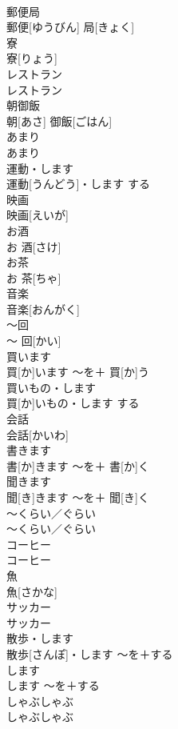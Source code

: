 \documentclass[8pt]{extreport}
\begin{document}
\begin{CJK}{UTF8}{min}
\\	郵便局	
\\	郵便[ゆうびん] 局[きょく]		
\\	寮	
\\	寮[りょう]		
\\	レストラン	
\\	レストラン		
\\	朝御飯	
\\	朝[あさ] 御飯[ごはん]		
\\	あまり	
\\	あまり		
\\	運動・します	
\\	運動[うんどう]・します	する	
\\	映画	
\\	映画[えいが]		
\\	お酒	
\\	お 酒[さけ]		
\\	お茶	
\\	お 茶[ちゃ]		
\\	音楽	
\\	音楽[おんがく]		
\\	〜回	
\\	〜 回[かい]		
\\	買います	
\\	買[か]います	〜を＋ 買[か]う	
\\	買いもの・します	
\\	買[か]いもの・します	する	
\\	会話	
\\	会話[かいわ]		
\\	書きます	
\\	書[か]きます	〜を＋ 書[か]く	
\\	聞きます	
\\	聞[き]きます	〜を＋ 聞[き]く	
\\	〜くらい／ぐらい	
\\	〜くらい／ぐらい		
\\	コーヒー	
\\	コーヒー		
\\	魚	
\\	魚[さかな]		
\\	サッカー	
\\	サッカー		
\\	散歩・します	
\\	散歩[さんぽ]・します	〜を＋する	
\\	します	
\\	します	〜を＋する	
\\	しゃぶしゃぶ	
\\	しゃぶしゃぶ		

\end{CJK}
\end{document}

